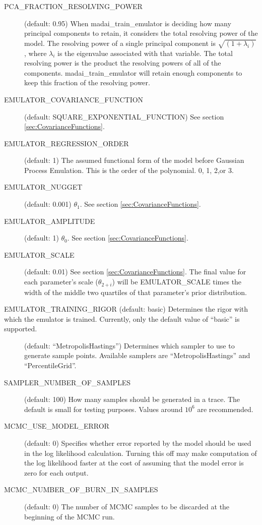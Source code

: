 \begin{description}
    \item[PCA\_FRACTION\_RESOLVING\_POWER] (default: 0.95)  When madai\_train\_emulator is deciding how many principal components to retain, it considers the total resolving power of the model. The resolving power of a single principal component is $\sqrt{(1 + \lambda_i)}$, where $\lambda_i$ is the eigenvalue associated with that variable. The total resolving power is the product the resolving powers of all of the components. madai\_train\_emulator will retain enough components to keep this fraction of the resolving power.
    \item[EMULATOR\_COVARIANCE\_FUNCTION] (default: SQUARE\_EXPONENTIAL\_FUNCTION) See section \ref{sec:CovarianceFunctions}.
    \item[EMULATOR\_REGRESSION\_ORDER] (default: 1) The assumed functional form of the model before Gaussian Process Emulation. This is the order of the polynomial. 0, 1, 2,or 3.
    \item[EMULATOR\_NUGGET] (default: 0.001) $\theta_1$. See section \ref{sec:CovarianceFunctions}.
    \item[EMULATOR\_AMPLITUDE] (default: 1) $\theta_0$. See section \ref{sec:CovarianceFunctions}.
    \item[EMULATOR\_SCALE] (default: 0.01) See section \ref{sec:CovarianceFunctions}. The final value for each parameter's scale ($\theta_{2+i}$) will be EMULATOR\_SCALE times the width of the middle two quartiles of that parameter's prior distribution.
    \item[EMULATOR\_TRAINING\_RIGOR (default: basic) Determines the rigor with which the emulator is trained. Currently, only the default value of ``basic'' is supported.
    \item[SAMPLER] (default: ``MetropolisHastings'') Determines which sampler to use to generate sample points. Available samplers are ``MetropolisHastings'' and ``PercentileGrid''.
    \item[SAMPLER\_NUMBER\_OF\_SAMPLES] (default: 100) How many samples should be generated in a trace. The default is small for testing purposes. Values around $10^6$ are recommended.
    \item[MCMC\_USE\_MODEL\_ERROR] (default: 0) Specifies whether error reported by the model should be used in the log likelihood calculation. Turning this off may make computation of the log likelihood faster at the cost of assuming that the model error is zero for each output.
    \item[MCMC\_NUMBER\_OF\_BURN\_IN\_SAMPLES] (default: 0) The number of MCMC samples to be discarded at the beginning of the MCMC run.

\end{description}
